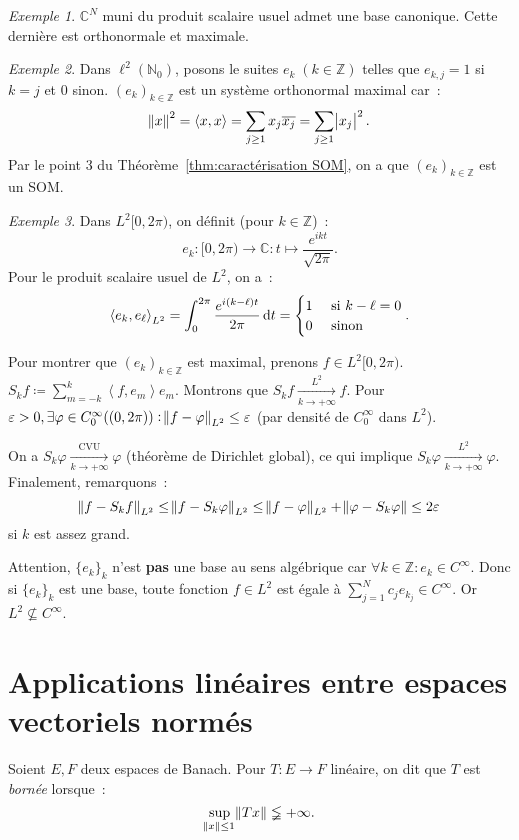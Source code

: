 \documentclass{report}
\newcommand{\C}{{\mathbb C}}
\newcommand{\Z}{{\mathbb Z}}
\newcommand{\N}{{\mathbb N}}
\newcommand{\scpr}[2]{\left\langle#1, #2\right\rangle}
\newcommand{\pinfty}{{+\infty}}
\theoremstyle{definition}
\theoremstyle{remark}
\newtheorem{ex}{Exemple}[chapter]
\begin{document}
\begin{ex}
$\C^N$ muni du produit scalaire usuel admet une base canonique. Cette dernière est orthonormale et maximale.
\end{ex}

\begin{ex}
Dans $\ell^2(\N_0)$, posons le suites $e_k \; (k \in \Z)$ telles que $e_{k,j} = 1$ si $k=j$ et $0$ sinon. $(e_k)_{k \in \Z}$ est un système orthonormal maximal car~:
\[\norm x^2 = \scpr xx = \sum_{j \geq 1}x_j\overline {x_j} = \sum_{j \geq 1}\abs {x_j}^2.\]
Par le point 3 du Théorème~\ref{thm:caractérisation SOM}, on a que $(e_k)_{k \in \Z}$ est un SOM.
\end{ex}

\begin{ex}
Dans $L^2[0, 2\pi)$, on définit (pour $k \in \Z$)~:
\[e_k : [0, 2\pi) \to \C : t \mapsto \frac {e^{ikt}}{\sqrt {2\pi}}.\]
Pour le produit scalaire usuel de $L^2$, on a~:
\[\scpr {e_k}{e_\ell}_{L^2} = \int_0^{2\pi}\frac {e^{i(k-\ell)t}}{2\pi}\dif t = \begin{cases}1 &\text{ si } k-\ell = 0 \\0 &\text{ sinon}\end{cases}.\]

Pour montrer que $(e_k)_{k \in \Z}$ est maximal, prenons $f \in L^2[0, 2\pi)$. $S_kf \coloneqq \sum_{m=-k}^k\scpr f{e_m}e_m.$ Montrons que $S_kf \xrightarrow[k \to \pinfty]{L^2} f$.
Pour $\varepsilon > 0, \exists \varphi \in C_0^\infty((0, 2\pi)) : \norm {f-\varphi}_{L^2} \leq \varepsilon$ (par densité de $C_0^\infty$ dans $L^2$).

On a $S_k\varphi \xrightarrow[k \to \pinfty]{\text{CVU}} \varphi$ (théorème de Dirichlet global), ce qui implique $S_k\varphi \xrightarrow[k \to \pinfty]{L^2} \varphi$.
Finalement, remarquons~:
\[\norm {f-S_kf}_{L^2} \leq \norm {f-S_k\varphi}_{L^2} \leq \norm {f-\varphi}_{L^2} + \norm {\varphi - S_k\varphi} \leq 2\varepsilon\]
si $k$ est assez grand.

Attention, $\{e_k\}_k$ n'est \textbf{pas} une base au sens algébrique car $\forall k \in \Z : e_k \in C^\infty$. Donc si $\{e_k\}_k$ est une base, toute fonction $f \in L^2$ est
égale à $\sum_{j=1}^Nc_je_{k_j} \in C^\infty$. Or $L^2 \not \subseteq C^\infty$.
\end{ex}

\section{Applications linéaires entre espaces vectoriels normés}
Soient $E, F$ deux espaces de Banach. Pour $T : E \to F$ linéaire, on dit que $T$ est \textit{bornée} lorsque~:
\[\sup_{\norm x \leq 1}\norm {Tx} \lneqq \pinfty.\]
\end{document}
